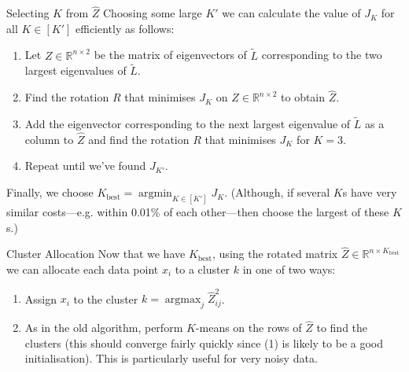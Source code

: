 \documentclass[aspectratio=169]{beamer}
\DeclareMathOperator*{\argmax}{argmax} %
\DeclareMathOperator*{\argmin}{argmin}
\begin{document}
\begin{frame}{Selecting $K$ from $\hat{Z}$}
  Choosing some large $K'$ we can calculate the value of $J_K$ for all $K \in [K']$ efficiently as follows:
  \pause
  \begin{enumerate}
    \item Let $Z \in \mathbb{R}^{n \times 2}$ be the matrix of eigenvectors of $\tilde{L}$ corresponding to the two largest eigenvalues of $\tilde{L}$.
    \pause\item Find the rotation $R$ that minimises $J_K$ on $Z \in \mathbb{R}^{n \times 2}$ to obtain $\hat{Z}$.
    \pause\item Add the eigenvector corresponding to the next largest eigenvalue of $\tilde{L}$ as a column to $\hat{Z}$ and find the rotation $R$ that minimises $J_K$ for $K = 3$.
    \pause\item Repeat until we've found $J_{K'}$.
  \end{enumerate}
  \pause
  Finally, we choose $K_{\text{best}} = \argmin_{K \in [K']} J_K$.
  (Although, if several $K$s have very similar costs---e.g. within 0.01\% of each other---then choose the largest of these $K$s.)

  \end{frame}

\begin{frame}{Cluster Allocation}
  Now that we have $K_{\text{best}}$, using the rotated matrix $\hat{Z} \in \mathbb{R}^{n \times K_{\text{best}}}$ we can allocate each data point $x_i$ to a cluster $k$ in one of two ways: 
  \pause 
  \begin{enumerate}[<+->]
    \item Assign $x_i$ to the cluster $k = \argmax_j \hat{Z}_{ij}^2$.
    \item As in the old algorithm, perform $K$-means on the rows of $\hat{Z}$ to find the clusters (this should converge fairly quickly since \alert{(1)} is likely to be a good initialisation).
    This is particularly useful for very noisy data.
  \end{enumerate}
\end{frame}
\end{document}
